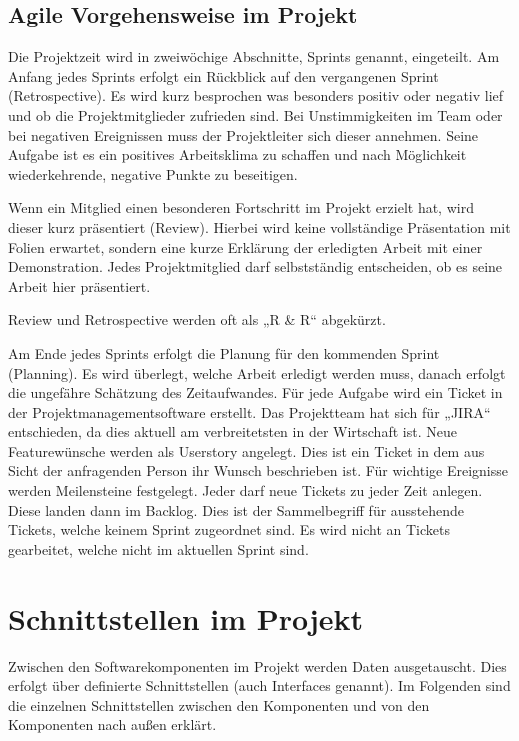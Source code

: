 \section{Agile Vorgehensweise im Projekt}
\label{sec:agile_vorgehensweise}
Die Projektzeit wird in zweiwöchige Abschnitte, Sprints genannt, eingeteilt. Am
Anfang jedes Sprints erfolgt ein Rückblick auf den vergangenen Sprint
(Retrospective). Es wird kurz besprochen was besonders positiv oder negativ
lief und ob die Projektmitglieder zufrieden sind. Bei Unstimmigkeiten im Team
oder bei negativen Ereignissen muss der Projektleiter sich dieser annehmen.
Seine Aufgabe ist es ein positives Arbeitsklima zu schaffen und nach
Möglichkeit wiederkehrende, negative Punkte zu beseitigen.

Wenn ein Mitglied einen besonderen Fortschritt im Projekt erzielt hat, wird
dieser kurz präsentiert (Review). Hierbei wird keine vollständige Präsentation
mit Folien erwartet, sondern eine kurze Erklärung der erledigten Arbeit mit
einer Demonstration. Jedes Projektmitglied darf selbstständig entscheiden, ob es
seine Arbeit hier präsentiert.

Review und Retrospective werden oft als „R \& R“ abgekürzt.

Am Ende jedes Sprints erfolgt die Planung für den kommenden Sprint (Planning).
Es wird überlegt, welche Arbeit erledigt werden muss, danach erfolgt die
ungefähre Schätzung des Zeitaufwandes. Für jede Aufgabe wird ein Ticket in der
Projektmanagementsoftware erstellt. Das Projektteam hat sich für „JIRA“
entschieden, da dies aktuell am verbreitetsten in der Wirtschaft ist. Neue
Featurewünsche werden als Userstory angelegt. Dies ist ein Ticket in dem aus
Sicht der anfragenden Person ihr Wunsch beschrieben ist. Für wichtige
Ereignisse werden Meilensteine festgelegt. Jeder darf neue Tickets zu jeder
Zeit anlegen. Diese landen dann im \gls{Backlog}. Dies ist der Sammelbegriff
für ausstehende Tickets, welche keinem Sprint zugeordnet sind. Es wird nicht an
Tickets gearbeitet, welche nicht im aktuellen Sprint sind.
\tm%

\chapter{Schnittstellen im Projekt}
Zwischen den Softwarekomponenten im Projekt werden Daten ausgetauscht. Dies
erfolgt über definierte Schnittstellen (auch Interfaces genannt). Im Folgenden
sind die einzelnen Schnittstellen zwischen den Komponenten und von den
Komponenten nach außen erklärt.
\tm%

